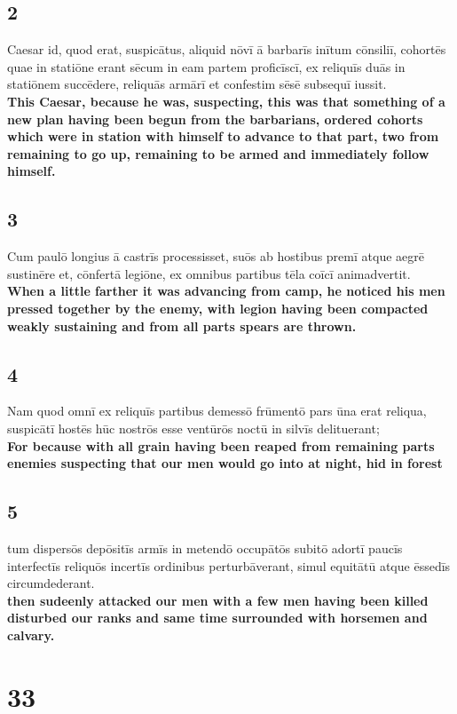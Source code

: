 \documentclass{article}
\begin{document}
\subsection*{2}
Caesar id, quod erat, suspicātus, aliquid nōvī ā barbarīs inītum cōnsiliī, cohortēs quae in statiōne erant sēcum in eam partem proficīscī, ex reliquīs duās in statiōnem succēdere, reliquās armārī et confestim sēsē subsequī iussit.\\
\textbf{This Caesar, because he was, suspecting, this was that something of a new plan having been begun from the barbarians, ordered cohorts which were in station with himself to advance to that part, two from remaining to go up, remaining to be armed and immediately follow himself.}

\subsection*{3}
Cum paulō longius ā castrīs processisset, suōs ab hostibus premī atque aegrē sustinēre et, cōnfertā legiōne, ex omnibus partibus tēla coīcī animadvertit. \\
\textbf{When a little farther it was advancing from camp, he noticed his men pressed together by the enemy, with legion having been compacted weakly sustaining and from all parts spears are thrown.}

\subsection*{4}
Nam quod omnī ex reliquīs partibus demessō frūmentō pars ūna erat reliqua, suspicātī hostēs hūc nostrōs esse ventūrōs noctū in silvīs delituerant; \\
\textbf{For because with all grain having been reaped from remaining parts enemies suspecting that our men would go into at night, hid in forest }

\subsection*{5}
tum dispersōs depōsitīs armīs in metendō occupātōs subitō adortī paucīs interfectīs reliquōs incertīs ordinibus perturbāverant, simul equitātū atque ēssedīs circumdederant.\\
\textbf{then sudeenly attacked our men with a few men having been killed disturbed our ranks and same time surrounded with horsemen and calvary.}


\section*{33}
\end{document}
